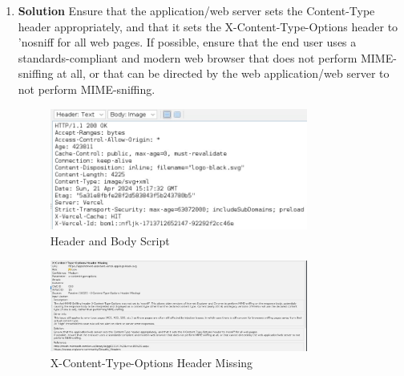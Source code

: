 \documentclass[openany]{report}
\begin{document}
\begin{enumerate}
    \item \textbf{Solution} Ensure that the application/web server sets the Content-Type header appropriately, and that it sets the X-Content-Type-Options header to 'nosniff for all web pages. If possible, ensure that the end user uses a standards-compliant and modern web browser that does not perform MIME-sniffing at all, or that can be directed by the web application/web server to not perform MIME-sniffing.
          \begin{figure}[H]
              \centering
              \includegraphics[width=0.8\textwidth]{imgs/6.jpg}
              \caption{ Header and Body Script}
              \label{fig:my_label10}
          \end{figure}
          \begin{figure}[H]
              \centering
              \includegraphics[width=0.8\textwidth]{imgs/Low2.jpg}
              \caption{X-Content-Type-Options Header Missing}
              \label{fig:my_label11}
          \end{figure}
\end{enumerate}
\end{document}
